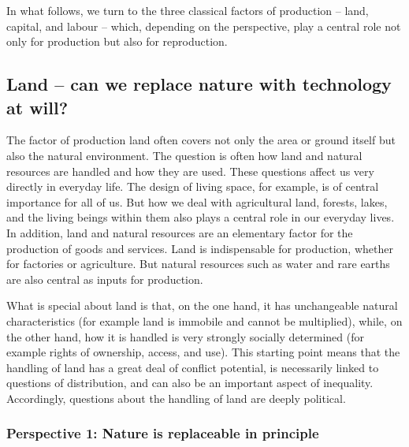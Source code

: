 \documentclass[
  british,
  a4paper,
  DIV=11,
  numbers=noendperiod,
  oneside,
  openany]{scrreprt}
\begin{document}
In what follows, we turn to the three classical factors of production --
land, capital, and labour -- which, depending on the perspective, play a
central role not only for production but also for reproduction.

\subsection{Land -- can we replace nature with technology at
will?}\label{land-can-we-replace-nature-with-technology-at-will}

The factor of production land often covers not only the area or ground
itself but also the natural environment. The question is often how land
and natural resources are handled and how they are used. These questions
affect us very directly in everyday life. The design of living space,
for example, is of central importance for all of us. But how we deal
with agricultural land, forests, lakes, and the living beings within
them also plays a central role in our everyday lives. In addition, land
and natural resources are an elementary factor for the production of
goods and services. Land is indispensable for production, whether for
factories or agriculture. But natural resources such as water and rare
earths are also central as inputs for production.

What is special about land is that, on the one hand, it has unchangeable
natural characteristics (for example land is immobile and cannot be
multiplied), while, on the other hand, how it is handled is very
strongly socially determined (for example rights of ownership, access,
and use). This starting point means that the handling of land has a
great deal of conflict potential, is necessarily linked to questions of
distribution, and can also be an important aspect of inequality.
Accordingly, questions about the handling of land are deeply political.

\subsubsection{Perspective 1: Nature is replaceable in
principle}\label{perspective-1-nature-is-replaceable-in-principle}
\end{document}
